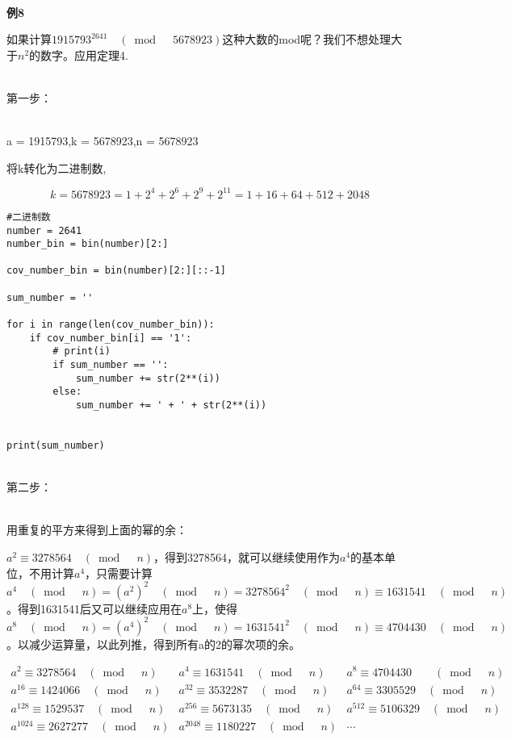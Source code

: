 \documentclass{article}
\begin{document}
~\\

\textbf{例8}

如果计算$1915793^{2641} \quad (\bmod \quad 5678923)$这种大数的mod呢？我们不想处理大于$n^2$的数字。应用定理4.

~\\

第一步：

~\\

a = 1915793,k = 5678923,n = 5678923

将k转化为二进制数,

$$k = 5678923 = 1 + 2^4+2^6+2^9+2^{11} = 1+16+64+512+2048$$

\begin{lstlisting}
#二进制数
number = 2641
number_bin = bin(number)[2:]

cov_number_bin = bin(number)[2:][::-1]

sum_number = ''

for i in range(len(cov_number_bin)):
    if cov_number_bin[i] == '1':
        # print(i)
        if sum_number == '':
            sum_number += str(2**(i))
        else:
            sum_number += ' + ' + str(2**(i))
            

print(sum_number)
\end{lstlisting}

~\\

第二步：

~\\

用重复的平方来得到上面的幂的余：

$a^2 \equiv 3278564 \quad (\bmod \quad n)$，得到3278564，就可以继续使用作为$a^4$的基本单位，不用计算$a^4$，只需要计算$a^4 \quad (\bmod \quad n)= (a^2)^2 \quad (\bmod \quad n)= 3278564^2 \quad (\bmod \quad n) \equiv 1631541 \quad (\bmod \quad n)  $。得到1631541后又可以继续应用在$a^8$上，使得$a^8  \quad (\bmod \quad n) = (a^4)^2  \quad (\bmod \quad n) = 1631541^2  \quad (\bmod \quad n) \equiv 4704430  \quad (\bmod \quad n) $。以减少运算量，以此列推，得到所有a的2的幂次项的余。

$$
\begin{array}{lll}
a^{2} \equiv 3278564 \quad (\bmod \quad n) & a^{4} \equiv 1631541 \quad (\bmod \quad n) & a^{8} \equiv 4704430 \quad  \quad (\bmod \quad n) \\
a^{16} \equiv 1424066 \quad (\bmod  \quad n) & a^{32} \equiv 3532287 \quad (\bmod \quad n) & a^{64} \equiv 3305529 \quad (\bmod \quad n) \\
a^{128} \equiv 1529537 \quad (\bmod \quad n) & a^{256} \equiv 5673135 \quad (\bmod \quad n) & a^{512} \equiv 5106329 \quad (\bmod \quad n) \\
a^{1024} \equiv 2627277 \quad (\bmod \quad n) & a^{2048} \equiv 1180227 \quad (\bmod \quad n) & \cdots
\end{array}
$$
\end{document}
